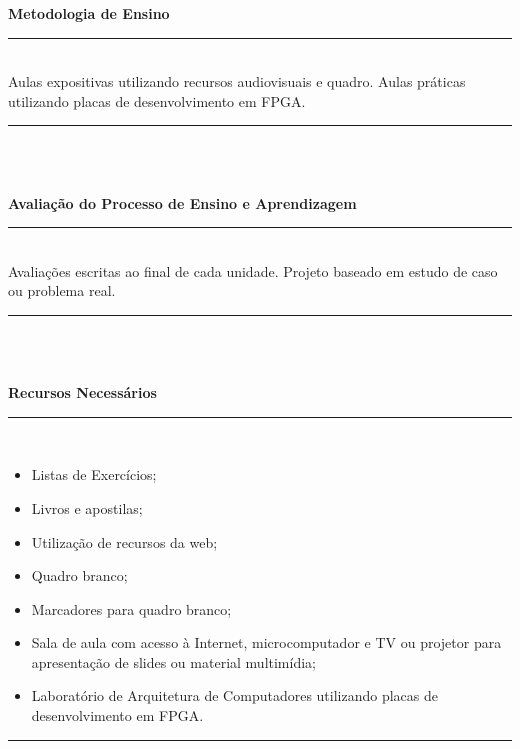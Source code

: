 \vspace{-12mm}
\begin{center}\textbf{Metodologia de Ensino}\end{center} 
\vspace{-5mm}
\noindent\rule{16.5cm}{0.4pt}
\\
   Aulas expositivas utilizando recursos audiovisuais e quadro. Aulas práticas utilizando placas de desenvolvimento em FPGA.\\
\noindent\rule{16.5cm}{0.4pt}\\
\\
\vspace{-12mm}
\begin{center}\textbf{Avaliação do Processo de Ensino e Aprendizagem}\end{center}
\vspace{-5mm}
\noindent\rule{16.5cm}{0.4pt}
\\
  Avaliações escritas ao final de cada unidade. Projeto baseado em estudo de caso ou problema real.\\
\noindent\rule{16.5cm}{0.4pt}\\
\\
\vspace{-12mm}
\begin{center}\textbf{Recursos Necessários}\end{center}
\vspace{-5mm}
\noindent\rule{16.5cm}{0.4pt}
\\
\begin{itemize} 
  \item Listas de Exercícios;
    \item Livros e apostilas;
    \item Utilização de recursos da web;
    \item Quadro branco;
    \item Marcadores para quadro branco;
    \item Sala de aula com acesso à Internet, microcomputador e TV ou projetor para apresentação de slides ou material multimídia;
    \item Laboratório de Arquitetura de Computadores utilizando placas de desenvolvimento em FPGA.
\end{itemize}
\noindent\rule{16.5cm}{0.4pt}\\
\\
\vspace{-12mm}
